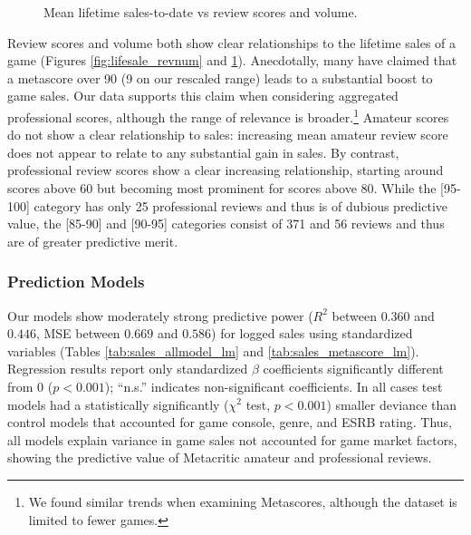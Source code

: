 \documentclass{sig-alternate}
\begin{document}
\begin{figure}[tb]
\begin{subfigure}[b]{\linewidth}
\label{fig:lifesale_revscore}
\end{subfigure}

\caption{Mean lifetime sales-to-date vs review scores and volume.}
\label{fig:lifesale_plots}
\end{figure}


Review scores and volume both show clear relationships to the lifetime sales of a game (Figures \ref{fig:lifesale_revnum} and \ref{fig:lifesale_revscore}). Anecdotally, many have claimed that a metascore over 90 (9 on our rescaled range) leads to a substantial boost to game sales. Our data supports this claim when considering aggregated professional scores, although the range of relevance is broader.\footnote{We found similar trends when examining Metascores, although the dataset is limited to fewer games.} Amateur scores do not show a clear relationship to sales: increasing mean amateur review score does not appear to relate to any substantial gain in sales. By contrast, professional review scores show a clear increasing relationship, starting around scores above 60 but becoming most prominent for scores above 80. While the [95-100] category has only 25 professional reviews and thus is of dubious predictive value, the [85-90] and [90-95] categories consist of 371 and 56 reviews and thus are of greater predictive merit.

\subsubsection{Prediction Models}
Our models show moderately strong predictive power ($R^2$ between $0.360$ and $0.446$, MSE between $0.669$ and $0.586$) for logged sales using standardized variables (Tables \ref{tab:sales_allmodel_lm} and \ref{tab:sales_metascore_lm}). Regression results report only standardized $\beta$ coefficients significantly different from 0 ($p < 0.001$); ``n.s.'' indicates non-significant coefficients. In all cases test models had a statistically significantly ($\chi^2$ test, $p < 0.001$) smaller deviance than control models that accounted for game console, genre, and ESRB rating. Thus, all models explain variance in game sales not accounted for game market factors, showing the predictive value of Metacritic amateur and professional reviews.
\end{document}
